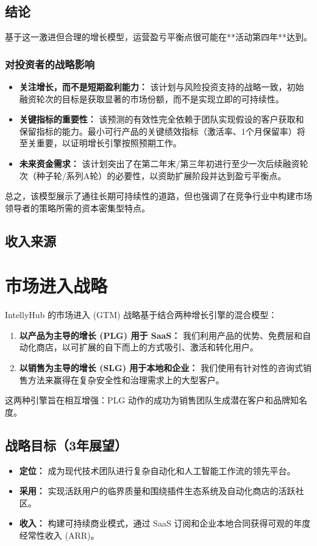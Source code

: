 \documentclass[11pt, a4paper, oneside]{article}
\begin{document}
\subsection{结论}
基于这一激进但合理的增长模型，运营盈亏平衡点很可能在**活动第四年**达到。

\subsubsection*{对投资者的战略影响}
\begin{itemize}
    \item \textbf{关注增长，而不是短期盈利能力：} 该计划与风险投资支持的战略一致，初始融资轮次的目标是获取显著的市场份额，而不是实现立即的可持续性。
    \item \textbf{关键指标的重要性：} 该预测的有效性完全依赖于团队实现假设的客户获取和保留指标的能力。最小可行产品的关键绩效指标（激活率、1个月保留率）将至关重要，以证明增长引擎按照预期工作。
    \item \textbf{未来资金需求：} 该计划突出了在第二年末/第三年初进行至少一次后续融资轮次（种子轮/系列A轮）的必要性，以资助扩展阶段并达到盈亏平衡点。
\end{itemize}
总之，该模型展示了通往长期可持续性的道路，但也强调了在竞争行业中构建市场领导者的策略所需的资本密集型特点。

\subsection{收入来源}

\section{市场进入战略}

IntellyHub 的市场进入 (GTM) 战略基于结合两种增长引擎的混合模型：
\begin{enumerate}
    \item \textbf{以产品为主导的增长 (PLG) 用于 SaaS：} 我们利用产品的优势、免费层和自动化商店，以可扩展的自下而上的方式吸引、激活和转化用户。
    \item \textbf{以销售为主导的增长 (SLG) 用于本地和企业：} 我们使用有针对性的咨询式销售方法来赢得在复杂安全性和治理需求上的大型客户。
\end{enumerate}
这两种引擎旨在相互增强：PLG 动作的成功为销售团队生成潜在客户和品牌知名度。

\subsection{战略目标（3年展望）}
\begin{itemize}
    \item \textbf{定位：} 成为现代技术团队进行复杂自动化和人工智能工作流的领先平台。
    \item \textbf{采用：} 实现活跃用户的临界质量和围绕插件生态系统及自动化商店的活跃社区。
    \item \textbf{收入：} 构建可持续商业模式，通过 SaaS 订阅和企业本地合同获得可观的年度经常性收入 (ARR)。
\end{itemize}
\end{document}
